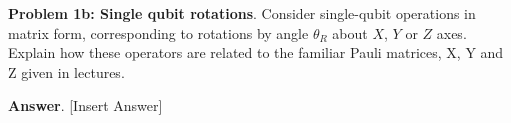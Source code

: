 \textbf{Problem 1b: Single qubit rotations}. Consider single-qubit operations in matrix form, corresponding to rotations by angle $\theta_R$ about $X$, $Y$ or $Z$ axes.
Explain how these operators are related to the familiar Pauli matrices, X, Y and Z given in lectures.


\textbf{Answer}. [Insert Answer]


